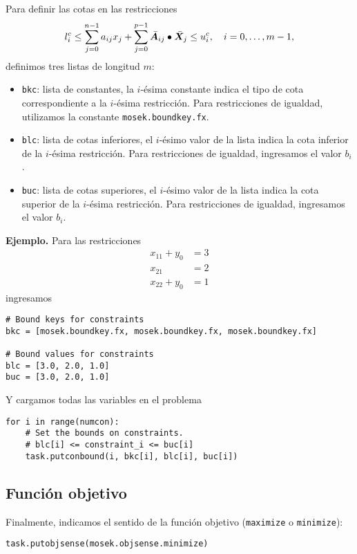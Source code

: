 \documentclass[11pt]{article}
\begin{document}
Para definir las cotas en las restricciones 
$$l_i^c \le \sum_{j=0}^{n-1} a_{ij} x_j + \sum_{j=0}^{p-1} \bar {\bm{A}}_{ij} \bullet \bar {\bm{X}}_j \le u_i^c, \quad i = 0, \dots, m-1,$$
definimos tres listas de longitud $m$:
\begin{itemize}
\item \texttt{bkc}: lista de constantes, la $i$-ésima constante indica el tipo de cota correspondiente a la $i$-ésima restricción. Para restricciones de igualdad, utilizamos la constante \texttt{mosek.boundkey.fx}.
\item \texttt{blc}: lista de cotas inferiores, el $i$-ésimo valor de la lista indica la cota inferior de la $i$-ésima restricción. Para restricciones de igualdad, ingresamos el valor $b_i$.
\item \texttt{buc}: lista de cotas superiores, el $i$-ésimo valor de la lista indica la cota superior de la $i$-ésima restricción. Para restricciones de igualdad, ingresamos el valor $b_i$.
\end{itemize}

\textbf{Ejemplo.} Para las restricciones
\begin{align*}
x_{11} + y_0 &= 3 \\
x_{21} &= 2 \\
x_{22} + y_0 &= 1
\end{align*}
ingresamos
\begin{lstlisting}
# Bound keys for constraints
bkc = [mosek.boundkey.fx, mosek.boundkey.fx, mosek.boundkey.fx]

# Bound values for constraints
blc = [3.0, 2.0, 1.0]
buc = [3.0, 2.0, 1.0]
\end{lstlisting}

Y cargamos todas las variables en el problema
\begin{lstlisting}
for i in range(numcon):
    # Set the bounds on constraints.
    # blc[i] <= constraint_i <= buc[i]
    task.putconbound(i, bkc[i], blc[i], buc[i])
\end{lstlisting}

\subsection{Función objetivo}

Finalmente, indicamos el sentido de la función objetivo (\texttt{maximize} o \texttt{minimize}):
\begin{lstlisting}
task.putobjsense(mosek.objsense.minimize)
\end{lstlisting}
\end{document}
